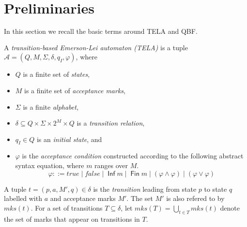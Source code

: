 \documentclass[runningheads]{llncs}
\DeclareMathOperator{\Inf}{\mathsf{Inf}}
\DeclareMathOperator{\Fin}{\mathsf{Fin}}
\newcommand{\minf}{\mathit{inf}}
\newcommand{\mks}{\mathit{mks}}
\def\false{\mathit{false}}
\def\true{\mathit{true}}
\newcommand{\mA}{\mathcal{A}}
\begin{document}

\section{Preliminaries}\label{sec:prelim}

In this section we recall the basic terms around TELA and QBF.

\begin{definition}[TELA]
  A \emph{transition-based Emerson-Lei automaton (TELA)} is a tuple
  $\mA =(Q,M,\Sigma,\delta,q_I,\varphi)$, where
  \begin{itemize}
  \item $Q$ is a finite set of \emph{states},
  \item $M$ is a finite set of \emph{acceptance marks},
  \item $\Sigma$ is a finite \emph{alphabet},
  \item $\delta \subseteq Q \times \Sigma \times 2^{M} \times Q$ is a
    \emph{transition relation},
  \item $q_I\in Q$ is an \emph{initial state}, and
  \item $\varphi$ is the \emph{acceptance condition} constructed
    according to the following abstract syntax equation, where $m$
    ranges over $M$.
    $$\varphi ::= \true \mid \false \mid \Inf m \mid \Fin m \mid \left( \varphi \land \varphi \right) \mid \left( \varphi \lor \varphi \right)$$
\end{itemize}
\end{definition}

A tuple $t=(p,a,M',q)\in\delta$ is the \emph{transition} leading from
state $p$ to state $q$ labelled with $a$ and acceptance marks $M'$.
The set $M'$ is also refered to by $\mks(t)$. For a set of transitions
$T\subseteq\delta$, let $\mks(T)=\bigcup_{t\in T}\mks(t)$ denote the
set of marks that appear on transitions in $T$.
\end{document}
